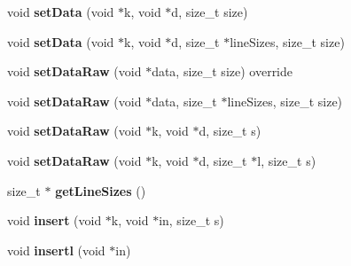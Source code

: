 \begin{DoxyCompactItemize}
\item 
\hypertarget{classfaster_1_1workerFdd_a168689aa68b6a02374d0f78ea0b2a3ed}{}void {\bfseries set\+Data} (void $\ast$k, void $\ast$d, size\+\_\+t size)\label{classfaster_1_1workerFdd_a168689aa68b6a02374d0f78ea0b2a3ed}

\item 
\hypertarget{classfaster_1_1workerFdd_ac399b11ae3a5a385acb52c2547baec51}{}void {\bfseries set\+Data} (void $\ast$k, void $\ast$d, size\+\_\+t $\ast$line\+Sizes, size\+\_\+t size)\label{classfaster_1_1workerFdd_ac399b11ae3a5a385acb52c2547baec51}

\item 
\hypertarget{classfaster_1_1workerFdd_abe1fe4ca054f914d12d2e24bd8ea49df}{}void {\bfseries set\+Data\+Raw} (void $\ast$data, size\+\_\+t size) override\label{classfaster_1_1workerFdd_abe1fe4ca054f914d12d2e24bd8ea49df}

\item 
\hypertarget{classfaster_1_1workerFdd_a60851f472a919037ae93c0ddf2fdbc4c}{}void {\bfseries set\+Data\+Raw} (void $\ast$data, size\+\_\+t $\ast$line\+Sizes, size\+\_\+t size)\label{classfaster_1_1workerFdd_a60851f472a919037ae93c0ddf2fdbc4c}

\item 
\hypertarget{classfaster_1_1workerFdd_af42e9fc7c5a824c63882b5fd6f494556}{}void {\bfseries set\+Data\+Raw} (void $\ast$k, void $\ast$d, size\+\_\+t s)\label{classfaster_1_1workerFdd_af42e9fc7c5a824c63882b5fd6f494556}

\item 
\hypertarget{classfaster_1_1workerFdd_a3247e1b4c7f74766d8f9bfb95ec35783}{}void {\bfseries set\+Data\+Raw} (void $\ast$k, void $\ast$d, size\+\_\+t $\ast$l, size\+\_\+t s)\label{classfaster_1_1workerFdd_a3247e1b4c7f74766d8f9bfb95ec35783}

\item 
\hypertarget{classfaster_1_1workerFdd_a121dcdce7e9348a0fc65b5880cb499b3}{}size\+\_\+t $\ast$ {\bfseries get\+Line\+Sizes} ()\label{classfaster_1_1workerFdd_a121dcdce7e9348a0fc65b5880cb499b3}

\item 
\hypertarget{classfaster_1_1workerFdd_a168e376cf191c14355f748526861962c}{}void {\bfseries insert} (void $\ast$k, void $\ast$in, size\+\_\+t s)\label{classfaster_1_1workerFdd_a168e376cf191c14355f748526861962c}

\item 
\hypertarget{classfaster_1_1workerFdd_af4ce92cd1a88a5a568df4cb8dd3429ae}{}void {\bfseries insertl} (void $\ast$in)\label{classfaster_1_1workerFdd_af4ce92cd1a88a5a568df4cb8dd3429ae}


\end{DoxyCompactItemize}
